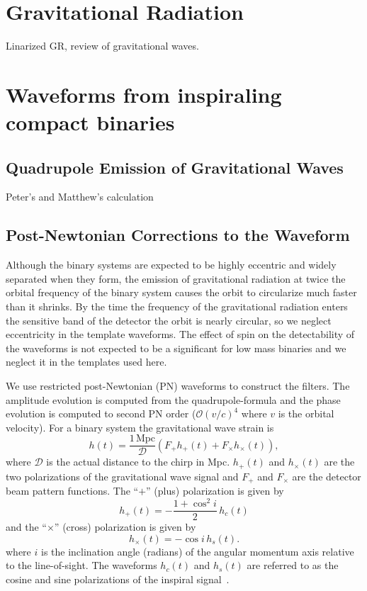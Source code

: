 
\section{Gravitational Radiation}

Linarized GR, review of gravitational waves.

\section{Waveforms from inspiraling compact binaries}
\label{s:waveforms}

\subsection{Quadrupole Emission of Gravitational Waves}

Peter's and Matthew's calculation

\subsection{Post-Newtonian Corrections to the Waveform}



Although the binary systems are expected to be highly eccentric and widely
separated when they form\cite{bkb}, the emission of gravitational radiation at
twice the orbital frequency of the binary system causes the orbit to
circularize much faster than it shrinks\cite{peters}. By the time the
frequency of the gravitational radiation enters the sensitive band of the 
detector the orbit is nearly circular, so we neglect eccentricity in the
template waveforms. The effect of spin on the detectability of the waveforms
is not expected to be a significant for low mass binaries\cite{apos} and we
neglect it in the templates used here.

We use restricted post-Newtonian (PN) waveforms to construct the filters. The
amplitude evolution is computed from the quadrupole-formula\cite{petersmath}
and the phase evolution is computed to second PN order ($\mathcal{O}(v/c)^4$
where $v$ is the orbital velocity).  For a binary system the gravitational 
wave strain is
\begin{equation}
h(t) = \frac{1\,\mathrm{Mpc}}{\mathcal{D}}\left(F_{+}h_{+}(t) +
F_{\times}h_{\times}(t)\right),
\end{equation}
where $\mathcal{D}$ is the actual distance to the chirp in Mpc. $h_{+}(t)$
and $h_{\times}(t)$ are the two polarizations of the gravitational wave signal
and $F_{+}$ and $F_{\times}$ are the detector beam pattern functions. The
``$+$'' (plus) polarization is given by
\begin{equation}
h_{+}(t) = -\frac{1 + \cos^2 i}{2}\,h_c(t)
\end{equation}
and the ``$\times$'' (cross) polarization is given by
\begin{equation}
h_{\times}(t) = -\cos i\,h_s(t).
\end{equation}
where $i$ is the inclination angle (radians) of the angular momentum axis
relative to the line-of-sight. The waveforms $h_c(t)$ and $h_s(t)$ are referred
to as the cosine and sine polarizations of the inspiral signal~\cite{biww}.

